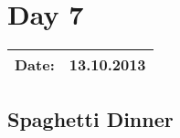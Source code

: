 \section{Day 7}
\begin{tabular}{|c|c|}
\hline
Date: & 13.10.2013 \\
\hline
\end{tabular}
\subsection{Spaghetti Dinner}

